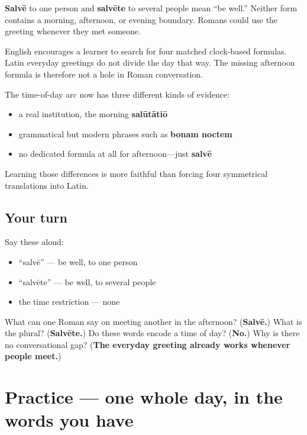 \begin{culture}
\textbf{Salvē} to one person and \textbf{salvēte} to several people mean \textquotedblleft{}be well.\textquotedblright{} Neither form contains a morning, afternoon, or evening boundary. Romans could use the greeting whenever they met someone.

English encourages a learner to search for four matched clock-based formulas. Latin everyday greetings do not divide the day that way. The missing afternoon formula is therefore not a hole in Roman conversation.

The time-of-day arc now has three different kinds of evidence:

\begin{itemize}
\raggedright
  \item a real institution, the morning \textbf{salūtātiō}
  \item grammatical but modern phrases such as \textbf{bonam noctem}
  \item no dedicated formula at all for afternoon—just \textbf{salvē}
\end{itemize}

Learning those differences is more faithful than forcing four symmetrical translations into Latin.
\end{culture}

\subsection*{Your turn}
Say these aloud:

\begin{itemize}
\raggedright
  \item \textquotedblleft{}salvē\textquotedblright{} — be well, to one person
  \item \textquotedblleft{}salvēte\textquotedblright{} — be well, to several people
  \item the time restriction — none
\end{itemize}

\begin{tcolorbox}[breakable,colback=teal!4,colframe=teal!35!black,title={Before you move on}]
What can one Roman say on meeting another in the afternoon? (\textbf{Salvē.}) What is the plural? (\textbf{Salvēte.}) Do these words encode a time of day? (\textbf{No.}) Why is there no conversational gap? (\textbf{The everyday greeting already works whenever people meet.})
\end{tcolorbox}
\section[Practice]{Practice — one whole day, in the words you have}

